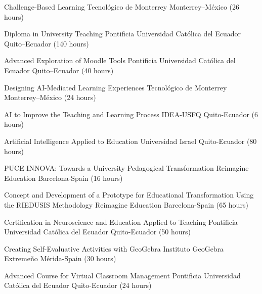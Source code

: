 \documentclass[
    a4paper,
    maincolor=cvblue!70!blue,
    sidecolor=gray!30,
    sectioncolor=cvblue!70!blue,
    sidebarwidth=7.5cm,
    topbottommargin=20pt,
    leftrightmargin=20pt,
]{fortysecondscv}
\begin{document}

    {Challenge-Based Learning}
    {Tecnológico de Monterrey}
    {Monterrey–México (26 hours)}

    {Diploma in University Teaching}
    {Pontificia Universidad Católica del Ecuador}
    {Quito–Ecuador (140 hours)}

    {Advanced Exploration of Moodle Tools}
    {Pontificia Universidad Católica del Ecuador}
    {Quito–Ecuador (40 hours)}

    {Designing AI-Mediated Learning Experiences}
    {Tecnológico de Monterrey}
    {Monterrey–México (24 hours)}

    {AI to Improve the Teaching and Learning Process}
    {IDEA-USFQ}
    {Quito-Ecuador (6 hours)}

    {Artificial Intelligence Applied to Education}
    {Universidad Israel}
    {Quito-Ecuador (80 hours)}

    {PUCE INNOVA: Towards a University Pedagogical Transformation}
    {Reimagine Education}
    {Barcelona-Spain (16 hours)}

    {Concept and Development of a Prototype for Educational Transformation Using the RIEDUSIS Methodology}
    {Reimagine Education}
    {Barcelona-Spain (65 hours)}

    {Certification in Neuroscience and Education Applied to Teaching}
    {Pontificia Universidad Católica del Ecuador}
    {Quito-Ecuador (50 hours)}

    {Creating Self-Evaluative Activities with GeoGebra}
    {Instituto GeoGebra Extremeño}
    {Mérida-Spain (30 hours)}

    {Advanced Course for Virtual Classroom Management}
    {Pontificia Universidad Católica del Ecuador}
    {Quito-Ecuador (24 hours)}


\end{document}
